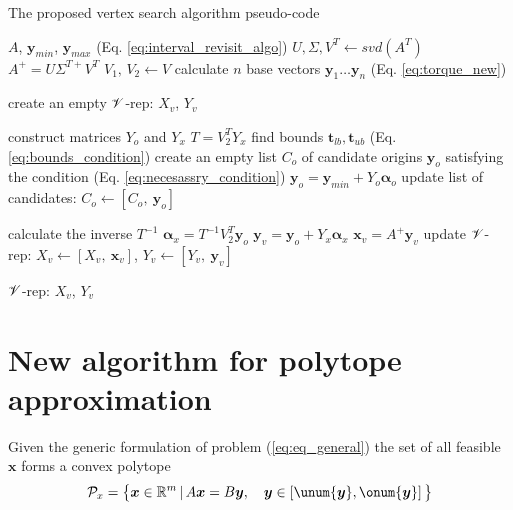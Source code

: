 \begin{algorithm}[!h]
\caption{The proposed vertex search algorithm pseudo-code}
\begin{algorithmic}
\REQUIRE $A$, $\bm{y}_{min}$, $\bm{y}_{max}$ (Eq. \ref{eq:interval_revisit_algo}) 
\STATE $U, \Sigma, V^T \leftarrow svd(A^T)$ 
\STATE $A^{+} = U\Sigma^{T+}V^T$
\STATE $V_1,\, V_2  \leftarrow V $
\STATE calculate $n$ base vectors $\bm{y}_1 \dotsc \bm{y}_n$ (Eq. \ref{eq:torque_new})

\STATE create an empty $\mathscr{V}$-rep: $X_v$, $Y_v$

\STATE construct matrices $Y_o$ and $Y_x$
\STATE $T = V_2^TY_x$
\STATE find bounds $\bm{t}_{lb},\bm{t}_{ub}$ (Eq. \ref{eq:bounds_condition})
\STATE create an empty list $C_o$ of candidate origins $\bm{y}_o$ satisfying the condition (Eq. \ref{eq:necesassry_condition})
\STATE $\bm{y}_o = \bm{y}_{min} +  Y_o\bm{\alpha}_o$ 
\STATE update list of candidates: $C_o \!\leftarrow\! [C_o,~ \bm{y}_o]$
\ENDIF
\ENDFOR

\STATE calculate the inverse $T^{-1}$
\STATE $\bm{\alpha}_x = T^{-1}V_2^T\bm{y}_o $
\STATE $\bm{y}_{v} = \bm{y}_o + Y_x\bm{\alpha}_x$ 
\STATE $\bm{x}_{v} = A^{+}\bm{y}_{v}$ 
\STATE update $\mathscr{V}$-rep: ${X}_{v} \!\leftarrow\! [{X}_{v},~ \bm{x}_v ]$, ${Y}_{v} \!\leftarrow\! [{Y}_{v},~ \bm{y}_v ]$ 
\ENDIF
\ENDFOR
\ENDIF


\ENDIF

\ENDFOR
\RETURN $\mathscr{V}$-rep: $X_v$, $Y_v$

\end{algorithmic}
\label{alg:algo_1}
\end{algorithm}


\section{New algorithm for polytope approximation}
\label{ch:algorihtm}

Given the generic formulation of problem (\ref{eq:eq_general}) the set of all feasible $\bm{x}$ forms a convex polytope 
\begin{equation}
    \mathcal{P}_x = \big\{ \bm{x}\in \mathbb{R}^{m}\, |\,A\bm{x} = B\bm{y},\quad  \bm{y}\in \left[\unum{\bm{y}}, \onum{\bm{y}}\right]  \big\}
    \label{eq:poly_init_2}
\end{equation}

